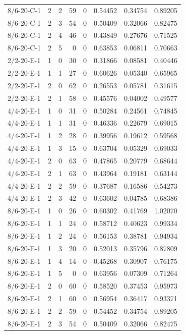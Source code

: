 \begin{longtable}{lrrrrrrr}
8/6-20-C-1 & 2 & 2 & 59 & 0 & 0.54452 & 0.34754 & 0.89205 \\
8/6-20-C-1 & 2 & 3 & 54 & 0 & 0.50409 & 0.32066 & 0.82475 \\
8/6-20-C-1 & 2 & 4 & 46 & 0 & 0.43849 & 0.27676 & 0.71525 \\
8/6-20-C-1 & 2 & 5 & 0 & 0 & 0.63853 & 0.06811 & 0.70663 \\
2/2-20-E-1 & 1 & 0 & 30 & 0 & 0.31866 & 0.08581 & 0.40446 \\
2/2-20-E-1 & 1 & 1 & 27 & 0 & 0.60626 & 0.05340 & 0.65965 \\
2/2-20-E-1 & 2 & 0 & 62 & 0 & 0.26553 & 0.05781 & 0.31615 \\
2/2-20-E-1 & 2 & 1 & 58 & 0 & 0.45576 & 0.04002 & 0.49577 \\
4/4-20-E-1 & 1 & 0 & 31 & 0 & 0.50284 & 0.24561 & 0.74845 \\
4/4-20-E-1 & 1 & 1 & 31 & 0 & 0.46336 & 0.22679 & 0.69015 \\
4/4-20-E-1 & 1 & 2 & 28 & 0 & 0.39956 & 0.19612 & 0.59568 \\
4/4-20-E-1 & 1 & 3 & 15 & 0 & 0.63704 & 0.05329 & 0.69033 \\
4/4-20-E-1 & 2 & 0 & 63 & 0 & 0.47865 & 0.20779 & 0.68644 \\
4/4-20-E-1 & 2 & 1 & 63 & 0 & 0.43964 & 0.19181 & 0.63144 \\
4/4-20-E-1 & 2 & 2 & 59 & 0 & 0.37687 & 0.16586 & 0.54273 \\
4/4-20-E-1 & 2 & 3 & 42 & 0 & 0.63602 & 0.04785 & 0.68386 \\
8/6-20-E-1 & 1 & 0 & 26 & 0 & 0.60302 & 0.41769 & 1.02070 \\
8/6-20-E-1 & 1 & 1 & 24 & 0 & 0.58712 & 0.40623 & 0.99334 \\
8/6-20-E-1 & 1 & 2 & 24 & 0 & 0.56153 & 0.38781 & 0.94934 \\
8/6-20-E-1 & 1 & 3 & 20 & 0 & 0.52013 & 0.35796 & 0.87809 \\
8/6-20-E-1 & 1 & 4 & 14 & 0 & 0.45268 & 0.30907 & 0.76175 \\
8/6-20-E-1 & 1 & 5 & 0 & 0 & 0.63956 & 0.07309 & 0.71264 \\
8/6-20-E-1 & 2 & 0 & 60 & 0 & 0.58520 & 0.37453 & 0.95973 \\
8/6-20-E-1 & 2 & 1 & 60 & 0 & 0.56954 & 0.36417 & 0.93371 \\
8/6-20-E-1 & 2 & 2 & 59 & 0 & 0.54452 & 0.34754 & 0.89205 \\
8/6-20-E-1 & 2 & 3 & 54 & 0 & 0.50409 & 0.32066 & 0.82475 \\

\end{longtable}

